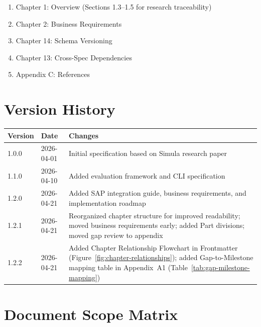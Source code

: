 \documentclass[12pt,a4paper,twoside]{report}
\begin{document}
\begin{tcolorbox}[colback=gray!5,colframe=gray!50,title=\faIcon{gavel} For Auditors / Compliance Officers]
\begin{enumerate}
\item Chapter 1: Overview (Sections 1.3--1.5 for research traceability)
\item Chapter 2: Business Requirements
\item Chapter 14: Schema Versioning
\item Chapter 13: Cross-Spec Dependencies
\item Appendix C: References
\end{enumerate}
\end{tcolorbox}

\section*{Version History}

\begin{longtable}{@{}llp{8cm}@{}}
\toprule
\textbf{Version} & \textbf{Date} & \textbf{Changes} \\
\midrule
\endhead
1.0.0 & 2026-04-01 & Initial specification based on Simula research paper \\
1.1.0 & 2026-04-10 & Added evaluation framework and CLI specification \\
1.2.0 & 2026-04-21 & Added SAP integration guide, business requirements, and implementation roadmap \\
1.2.1 & 2026-04-21 & Reorganized chapter structure for improved readability; moved business requirements early; added Part divisions; moved gap review to appendix \\
1.2.2 & 2026-04-21 & Added Chapter Relationship Flowchart in Frontmatter (Figure~\ref{fig:chapter-relationships}); added Gap-to-Milestone mapping table in Appendix~A1 (Table~\ref{tab:gap-milestone-mapping}) \\
\bottomrule
\end{longtable}

\section*{Document Scope Matrix}
\end{document}
